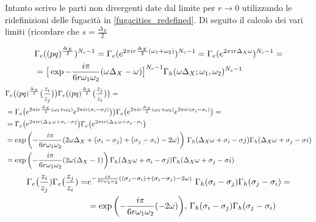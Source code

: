 \documentclass[a4paper,12pt]{article}
\begin{document}
Intanto scrivo le parti non divergenti date dal limite per $ r \rightarrow 0$ utilizzando le ridefinizioni delle fugacità in \ref{fugacities_redefined}. Di seguito il calcolo dei vari limiti (ricordare che $ s = \frac{\Delta_X}{2}$


\begin{align*}
& \Gamma_e((pq)^{\frac{\Delta_X}{2}})^{N_c -1} =
\Gamma_e( e^{2 \pi i r  {\Delta_X \over 2} (\omega_1 + \omega_2)})^{N_c-1} =  \Gamma_e( e^{2 \pi i r  \Delta_X \omega })^{N_c-1} = \\
&=\big[ \exp{- \frac{i \pi} {6 r \omega_1 \omega_2 }  ( \omega \Delta_X - \omega) }\big]^{N_c-1} \Gamma_h ( \omega \Delta_X ; \omega_1, \omega_2)^{N_c-1}
\end{align*}
 \begin{align*}
 & \Gamma_e\big( (pq)^{\frac{\Delta_X}{2}} \big( { z_i \over z_j} \big) \big) \Gamma_e \big( (pq)^{\frac{\Delta_X}{2}} \big( { z_j \over z_i} \big) \big) = \\
&= \Gamma_e\big( e^{2 \pi i r \frac{\Delta_X}{2} (\omega_1 + \omega_2)} e^{ 2 \pi  i r (\sigma_i - \sigma j)} \big) \big) \Gamma_e \big( e^{ 2 \pi i r \frac{\Delta_X}{2} (\omega_1 + \omega_2)}  e^{ 2 \pi i r (\sigma_j - \sigma_i)} \big) =  \\
&= \Gamma_e\big( e^{2 \pi  i r (\Delta_X \omega +\sigma_i - \sigma j} \big) \Gamma_e \big(  e^{2 \pi  i r (\Delta_X \omega +\sigma_j - \sigma_i} \big) \\
 & = \exp \bigg( {- \frac{i \pi} {6 r \omega_1 \omega_2 }  ( 2 \omega \Delta_X + (\sigma_i - \sigma_j)+(\sigma_j - \sigma_i) - 2 \omega) }\bigg)\, \, \Gamma_h ( \Delta_X \omega + \sigma_i - \sigma j ) \Gamma_h ( \Delta_X \omega + \sigma_j - \sigma i) \\
 & = \exp\bigg({- \frac{i \pi} {6 r \omega_1 \omega_2 }  ( 2 \omega (\Delta_X - 1) }\bigg)  \, \Gamma_h ( \Delta_X \omega + \sigma_i - \sigma j ) \Gamma_h ( \Delta_X \omega + \sigma_j - \sigma i)
\end{align*}
\begin{align*}
  \Gamma_e\big( {z_i \over z_j})\Gamma_e\big( {z_j \over z_i}) = &e^{- \frac{i \pi} {6 r \omega_1 \omega_2 }  ( (\sigma_j - \sigma_i) + (\sigma_i- \sigma_j) - 2 \omega)} \, \, \Gamma_h (  \sigma_i - \sigma_j) \Gamma_h (  \sigma_j - \sigma_i) =\\
& = \exp \bigg( {- \frac{i \pi} {6 r \omega_1 \omega_2 }  ( - 2 \omega)}  \bigg) , \, \Gamma_h (  \sigma_i - \sigma_j) \Gamma_h (  \sigma_j - \sigma_i)
\end{align*}
\end{document}
